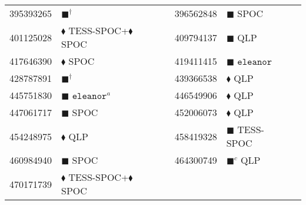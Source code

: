\begin{longtable}{llrllr}
395393265 & $\blacksquare^\dagger$ & \cite{TIC_428787891} & 396562848 & $\blacksquare$ SPOC & \cite{TIC_396562848} \\
401125028 & $\blacklozenge$ TESS-SPOC+$\blacklozenge$ SPOC & \cite{TIC_446549906} & 409794137 & $\blacksquare$ QLP & \cite{TIC_409794137} \\
417646390 & $\blacklozenge$ SPOC & \cite{TIC_70524163} & 419411415 & $\blacksquare$ $\texttt{eleanor}$ & \cite{TIC_419411415} \\
428787891 & $\blacksquare^\dagger$ & \cite{TIC_428787891} & 439366538 & $\blacklozenge$ QLP & \cite{TIC_439366538} \\
445751830 & $\blacksquare$ $\texttt{eleanor}^a$ & \cite{TIC_445751830} & 446549906 & $\blacklozenge$ QLP & \cite{TIC_446549906} \\
447061717 & $\blacksquare$ SPOC & \cite{TIC_447061717} & 452006073 & $\blacklozenge$ QLP & \cite{TIC_439366538} \\
454248975 & $\blacklozenge$ QLP & \cite{TIC_156648452} & 458419328 & $\blacksquare$ TESS-SPOC & \cite{TIC_458419328} \\
460984940 & $\blacksquare$ SPOC & \cite{TIC_460984940} & 464300749 & $\blacksquare^c$ QLP & \cite{TIC_464300749} \\
470171739 & $\blacklozenge$ TESS-SPOC+$\blacklozenge$ SPOC & \cite{TIC_446549906} \\


\end{longtable}
